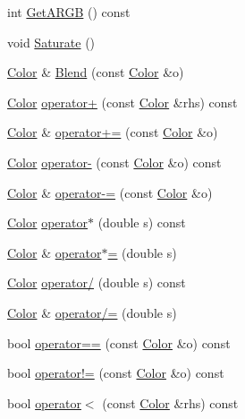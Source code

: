 \begin{DoxyCompactItemize}
int \hyperlink{classastu_1_1Color_a6e8ee28f89245f4e8d96c8c62144854f}{Get\+A\+R\+GB} () const
\item 
void \hyperlink{classastu_1_1Color_a612db0af9e13a8c64f1c215964d4d88f}{Saturate} ()
\item 
\hyperlink{classastu_1_1Color}{Color} \& \hyperlink{classastu_1_1Color_a3e246cf7b52ffda0f76a4fa0e7810763}{Blend} (const \hyperlink{classastu_1_1Color}{Color} \&o)
\item 
\hyperlink{classastu_1_1Color}{Color} \hyperlink{classastu_1_1Color_aca7e48a64d881e1287805f52b81a7066}{operator+} (const \hyperlink{classastu_1_1Color}{Color} \&rhs) const
\item 
\hyperlink{classastu_1_1Color}{Color} \& \hyperlink{classastu_1_1Color_af4c777a4e4cf3a7770d8499c4fa10c3e}{operator+=} (const \hyperlink{classastu_1_1Color}{Color} \&o)
\item 
\hyperlink{classastu_1_1Color}{Color} \hyperlink{classastu_1_1Color_ad9b6a108bc2d6581ad97057a00d2008f}{operator-\/} (const \hyperlink{classastu_1_1Color}{Color} \&o) const
\item 
\hyperlink{classastu_1_1Color}{Color} \& \hyperlink{classastu_1_1Color_ab80bfd9e234b9caed6900afea9a0ea2e}{operator-\/=} (const \hyperlink{classastu_1_1Color}{Color} \&o)
\item 
\hyperlink{classastu_1_1Color}{Color} \hyperlink{classastu_1_1Color_a287594eff638030b35765bfe00e76606}{operator$\ast$} (double s) const
\item 
\hyperlink{classastu_1_1Color}{Color} \& \hyperlink{classastu_1_1Color_adf79aa3c1511b986cb7ac14d32524ad4}{operator$\ast$=} (double s)
\item 
\hyperlink{classastu_1_1Color}{Color} \hyperlink{classastu_1_1Color_a9be3b7a9a3773bc7f82a2cd6ac6badbf}{operator/} (double s) const
\item 
\hyperlink{classastu_1_1Color}{Color} \& \hyperlink{classastu_1_1Color_afd37b7940911dd15ef36bae5a046033c}{operator/=} (double s)
\item 
bool \hyperlink{classastu_1_1Color_aa1b234404e692bd343d026f03c7b9832}{operator==} (const \hyperlink{classastu_1_1Color}{Color} \&o) const
\item 
bool \hyperlink{classastu_1_1Color_ad55ea16978ae52e3feb77109865921bd}{operator!=} (const \hyperlink{classastu_1_1Color}{Color} \&o) const
\item 
bool \hyperlink{classastu_1_1Color_a23c1c73e9815bdbae91de67d54f25cb8}{operator$<$} (const \hyperlink{classastu_1_1Color}{Color} \&rhs) const
\end{DoxyCompactItemize}
